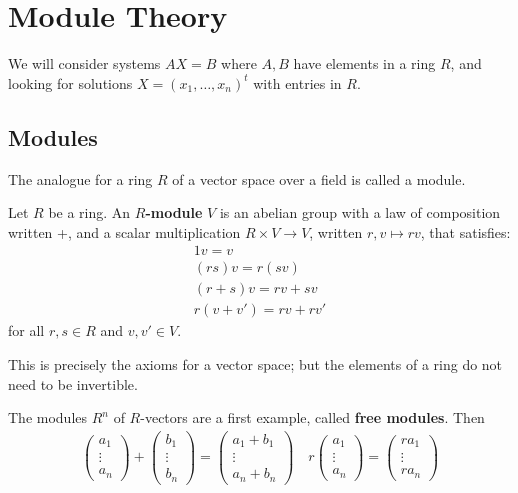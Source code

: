 \documentclass{memoir}
\begin{document}
\chapter{Module Theory}
\label{cha:module_theory}

We will consider systems \(AX =B\) where \(A,B\) have elements in a ring \(R\), and looking for solutions \(X = (x_1,\ldots,x_n)^{t}\) with entries in \(R\).

\section{Modules}
\label{sec:modules}

The analogue for a ring \(R\) of a vector space over a field is called a module.

\begin{defn}[Module]
	Let \(R\) be a ring. An \textbf{\(R\)-module} \(V\) is an abelian group with a law of composition written +, and a scalar multiplication \(R \times V \to V\), written \(r,v \mapsto rv\), that satisfies:
	\begin{align*}
		1v = v\\
		(rs)v = r(sv) \\
		(r+s)v = rv + sv \\
		r(v+v') = rv + rv'
	\end{align*}
	for all \(r,s \in R\) and \(v,v' \in V\).
\end{defn}
This is precisely the axioms for a vector space; but the elements of a ring do not need to be invertible.

\begin{exmp}
	The modules \(R^{n}\) of \(R\)-vectors are a first example, called \textbf{free modules}. Then
	\begin{align*}
		\begin{pmatrix} a_1 \\ \vdots \\ a_n \end{pmatrix} + \begin{pmatrix} b_1 \\ \vdots \\ b_n \end{pmatrix}  = \begin{pmatrix} a_1+b_1 \\ \vdots \\ a_n + b_n \end{pmatrix} \quad r \begin{pmatrix} a_1 \\ \vdots \\ a_n \end{pmatrix} = \begin{pmatrix} ra_1 \\ \vdots \\ ra_n \end{pmatrix} 
	\end{align*}
\end{exmp}
\end{document}

